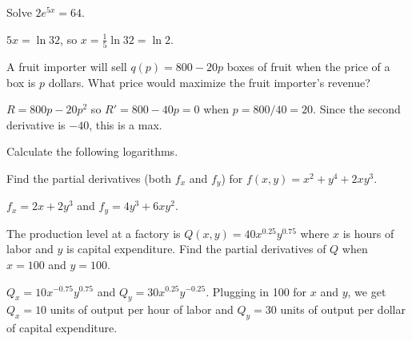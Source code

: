 \documentclass[12pt,answers]{exam}
\newcommand{\ds}{\displaystyle}
\begin{document}
\begin{questions}
\question Solve $2 e^{5x} = 64$. 
\begin{solution}
$5x = \ln 32$, so $x = \frac{1}{5} \ln 32 = \ln 2$. 
\end{solution}
\vfill

\question A fruit importer will sell $q(p) = 800 - 20p$ boxes of fruit when the price of a box is $p$ dollars. What price would maximize the fruit importer's revenue? 
\begin{solution}
$R = 800p - 20p^2$ so $R' = 800 - 40 p = 0$ when $ p = 800/40 = 20$.  Since the second derivative is $-40$, this is a max. 
\end{solution}
\vfill


\question Calculate the following logarithms.
\begin{multicols}{2}
\end{multicols}
\vfill

\newpage

\question Find the partial derivatives (both $f_x$ and $f_y$) for $f(x,y) = x^2 + y^4 + 2xy^3$.
\begin{solution}
$f_x = 2x + 2y^3$ and $f_y = 4y^3 + 6xy^2$.
\end{solution}
\vfill

\question The production level at a factory is $Q(x,y) = 40x^{0.25} y^{0.75}$ where $x$ is hours of labor and $y$ is capital expenditure.  Find the partial derivatives of $Q$ when $x = 100$ and $y = 100$.  %
\begin{solution}
$Q_x = 10 x^{-0.75}y^{0.75}$ and $Q_y = 30 x^{0.25} y^{-0.25}$. Plugging in 100 for $x$ and $y$, we get $Q_x = 10$ units of output per hour of labor and $Q_y = 30$ units of output per dollar of capital expenditure.%
\end{solution}
\vfill 


\end{questions}
\end{document}
